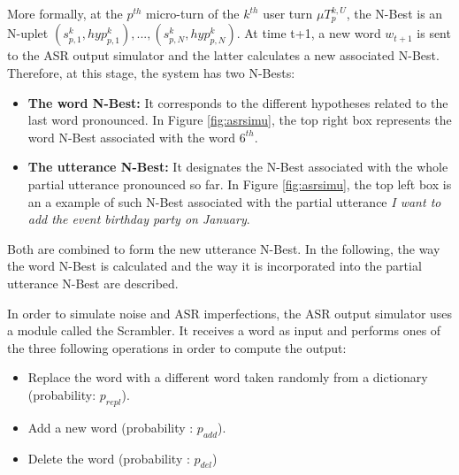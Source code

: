       	More formally, at the $p^{th}$ micro-turn of the $k^{th}$ user turn $\mu T^{k,U}_p$, the N-Best is an N-uplet ${(s^k_{p,1}, hyp^k_{p,1}),...,(s^k_{p,N}, hyp^k_{p,N})}$. At time t+1, a new word $w_{t+1}$ is sent to the ASR output simulator and the latter calculates a new associated N-Best. Therefore, at this stage, the system has two N-Bests:
				
				\begin{itemize}
					\item \textbf{The word N-Best:} It corresponds to the different hypotheses related to the last word pronounced. In Figure \ref{fig:asrsimu}, the top right box represents the word N-Best associated with the word $6^{th}$.
					\item \textbf{The utterance N-Best:} It designates the N-Best associated with the whole partial utterance pronounced so far. In Figure \ref{fig:asrsimu}, the top left box is an a example of such N-Best associated with the partial utterance \textit{I want to add the event birthday party on January}.
				\end{itemize}
				
				Both are combined to form the new utterance N-Best. In the following, the way the word N-Best is calculated and the way it is incorporated into the partial utterance N-Best are described.
				
				In order to simulate noise and ASR imperfections, the ASR output simulator uses a module called the Scrambler. It receives a word as input and performs ones of the three following operations in order to compute the output:
				
        
				\begin{itemize}
					\item Replace the word with a different word taken randomly from a dictionary (probability: $p_{repl}$).
					\item Add a new word (probability : $p_{add}$).
					\item Delete the word (probability : $p_{del}$)
				\end{itemize}
				
